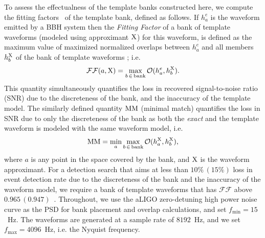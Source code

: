 To assess the effectualness of the template banks constructed here, we compute
the fitting factors~\cite{FittingFactorApostolatos} of the template bank,
defined as follows. If $h^e_a$ is the waveform emitted by a BBH system then the \textit{Fitting
Factor} of a bank of template waveforms (modeled using approximant $\mathrm{X}$) for
this waveform, is defined as the maximum value of maximized normalized
overlaps between $h^e_a$ and all members $h^{\mathrm{X}}_b$ of the bank of template
waveforms \cite{FittingFactorApostolatos}; i.e.
\begin{equation}\label{eq:defFF}
\mathcal{FF}(a,\X) = \underset{b\, \in\, \mathrm{bank}}{\textrm{max}}\,\Olap(h^e_a,h^{\X}_b).
\end{equation}
This quantity simultaneously quantifies the loss in recovered signal-to-noise
ratio (SNR) due to the discreteness of the bank, and the inaccuracy of the
template model. The similarly defined quantity $\mathrm{MM}$ (minimal match)
quantifies the loss in SNR due to only the discreteness of the bank as both
the \textit{exact} and the template waveform is modeled with the same waveform
model, i.e.
\begin{equation}
\mathrm{MM} = \underset{a}{\textrm{min}}\,\underset{b\, \in\, \mathrm{bank}}{\textrm{max}}\,\mathcal{O}(h^{\mathrm{X}}_a,h^{\mathrm{X}}_b),
\end{equation}
where $a$ is any point in the space covered by the bank, and $\mathrm{X}$ is the
waveform approximant. For a detection search that aims at less than $10\%\,
(15\%)$ loss in event detection rate due to the discreteness of the bank and
the inaccuracy of the waveform model, we require a bank of template waveforms
that has $\mathcal{FF}$ above $0.965\,
(0.947)$~\cite{WaveformAccuracy2008,WaveformAccuracy2010,CompTemplates2009}.
Throughout, we use the aLIGO zero-detuning high power noise curve as the
PSD for bank placement and overlap calculations, and set $f_\mathrm{min} =
15$~Hz. The waveforms are generated at a sample rate of $8192$~Hz, and we set 
$f_\mathrm{max} = 4096$~Hz, i.e. the Nyquist frequency.

